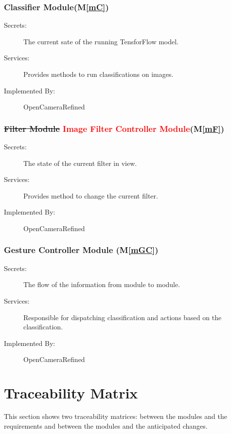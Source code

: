\documentclass[12pt, titlepage]{article}
\newcommand{\mref}[1]{M\ref{#1}}
\begin{document}
\subsubsection{Classifier Module(\mref{mC})}

\begin{description}
\item[Secrets:]The current sate of the running TensforFlow model.
\item[Services:]Provides methods to run classifications on images.
\item[Implemented By:] OpenCameraRefined
\end{description}

\subsubsection{\sout{Filter Module} \textcolor{red}{Image Filter Controller Module}(\mref{mF})}

\begin{description}
\item[Secrets:]The state of the current filter in view.
\item[Services:]Provides method to change the current filter.
\item[Implemented By:] OpenCameraRefined
\end{description}

\subsubsection{Gesture Controller Module (\mref{mGC})}

\begin{description}
\item[Secrets:]The flow of the information from module to module.
\item[Services:]Responsible for dispatching classification and actions based on the classification.
\item[Implemented By:] OpenCameraRefined
\end{description}


\section{Traceability Matrix} \label{SecTM}

This section shows two traceability matrices: between the modules and the
requirements and between the modules and the anticipated changes.
\end{document}
